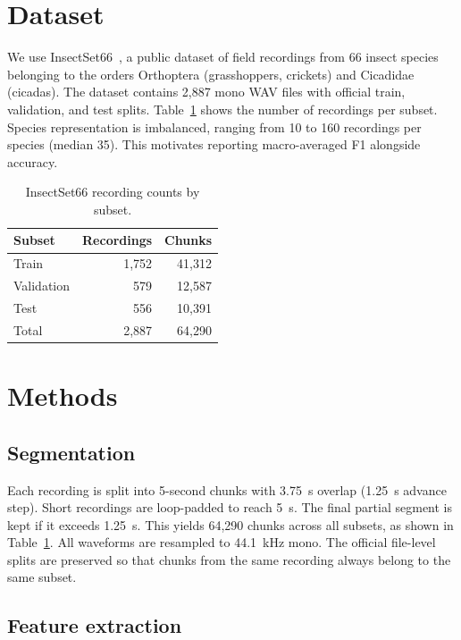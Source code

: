 
\section{Dataset}\label{sec:dataset}

We use InsectSet66~\cite{insectset66zenodo}, a public dataset of field recordings from 66 insect species belonging to the orders Orthoptera (grasshoppers, crickets) and Cicadidae (cicadas).
The dataset contains 2,887 mono WAV files with official train, validation, and test splits.
Table~\ref{tab:splits} shows the number of recordings per subset.
Species representation is imbalanced, ranging from 10 to 160 recordings per species (median 35).
This motivates reporting macro-averaged F1 alongside accuracy.

\begin{table}[!t]
\caption{InsectSet66 recording counts by subset.}
\label{tab:splits}
\centering
\begin{tabular}{lrr}
\toprule
Subset & Recordings & Chunks \\
\midrule
Train      & 1{,}752 & 41{,}312 \\
Validation & 579     & 12{,}587 \\
Test       & 556     & 10{,}391 \\
\midrule
Total      & 2{,}887 & 64{,}290 \\
\bottomrule
\end{tabular}
\end{table}

\section{Methods}\label{sec:methods}

\subsection{Segmentation}

Each recording is split into 5-second chunks with 3.75~s overlap (1.25~s advance step).
Short recordings are loop-padded to reach 5~s.
The final partial segment is kept if it exceeds 1.25~s.
This yields 64,290 chunks across all subsets, as shown in Table~\ref{tab:splits}.
All waveforms are resampled to 44.1~kHz mono.
The official file-level splits are preserved so that chunks from the same recording always belong to the same subset.

\subsection{Feature extraction}

